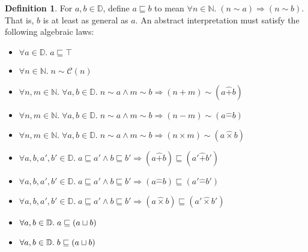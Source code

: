 \documentclass{amsbook}
\theoremstyle{definition}
\newtheorem{definition}[theorem]{Definition}
\theoremstyle{remark}
\numberwithin{section}{chapter}
\numberwithin{equation}{chapter}
\begin{document}
\begin{definition}
  For $a, b \in \mathbb D$, define $a \sqsubseteq b$ to mean $\forall n \in \mathbb N. \; (n \sim a) \Rightarrow (n \sim b)$.  That is, $b$ is at least as general as $a$.
  An abstract interpretation must satisfy the following algebraic laws:
  \begin{itemize}
  \item $\forall a \in \mathbb D. \; a \sqsubseteq \top$
  \item $\forall n \in \mathbb N. \; n \sim \mathcal C(n)$
  \item $\forall n, m \in \mathbb N. \; \forall a, b \in \mathbb D. \; n \sim a \land m \sim b \Rightarrow (n + m) \sim (a \hat{+} b)$
  \item $\forall n, m \in \mathbb N. \; \forall a, b \in \mathbb D. \; n \sim a \land m \sim b \Rightarrow (n - m) \sim (a \hat{-} b)$
  \item $\forall n, m \in \mathbb N. \; \forall a, b \in \mathbb D. \; n \sim a \land m \sim b \Rightarrow (n \times m) \sim (a \hat{\times} b)$
  \item $\forall a, b, a', b' \in \mathbb D. \; a \sqsubseteq a' \land b \sqsubseteq b' \Rightarrow (a \hat{+} b) \sqsubseteq (a' \hat{+} b')$
  \item $\forall a, b, a', b' \in \mathbb D. \; a \sqsubseteq a' \land b \sqsubseteq b' \Rightarrow (a \hat{-} b) \sqsubseteq (a' \hat{-} b')$
  \item $\forall a, b, a', b' \in \mathbb D. \; a \sqsubseteq a' \land b \sqsubseteq b' \Rightarrow (a \hat{\times} b) \sqsubseteq (a' \hat{\times} b')$
  \item $\forall a, b \in \mathbb D. \; a \sqsubseteq (a \sqcup b)$
  \item $\forall a, b \in \mathbb D. \; b \sqsubseteq (a \sqcup b)$
  \end{itemize}
\end{definition}

\newcommand{\E}[0]{\mathsf{E}}
\renewcommand{\O}[0]{\mathsf{O}}
\end{document}
